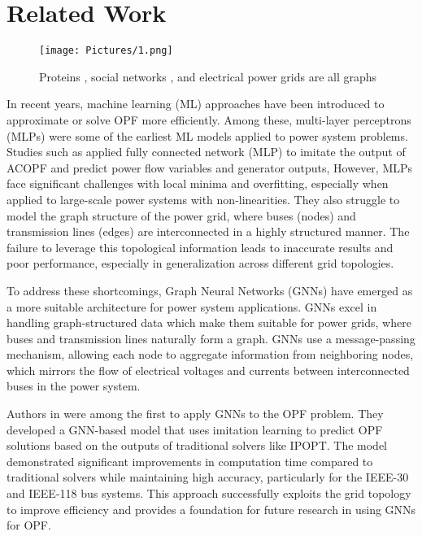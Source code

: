 \section{Related Work}
\label{gen_inst}

\begin{figure}[htbp]
  \centering
  \texttt{[image: Pictures/1.png]}
  \caption{Proteins \cite{vijayabaskar2011}, social networks \cite{ahmad2020}, and electrical power grids \cite{hosein2016} are all graphs}
  \label{fig:sample-figure}
\end{figure}

In recent years, machine learning (ML) approaches have been introduced to approximate or solve OPF more efficiently. Among these, multi-layer perceptrons (MLPs) were some of the earliest ML models applied to power system problems. Studies such as \cite{guha2019} applied fully connected network (MLP) to imitate the output of ACOPF and predict power flow variables and generator outputs, However, MLPs face significant challenges with local minima and overfitting, especially when applied to large-scale power systems with non-linearities. They also struggle to model the graph structure of the power grid, where buses (nodes) and transmission lines (edges) are interconnected in a highly structured manner. The failure to leverage this topological information leads to inaccurate results and poor performance, especially in generalization across different grid topologies.

To address these shortcomings, Graph Neural Networks (GNNs) have emerged as a more suitable architecture for power system applications. GNNs excel in handling graph-structured data which make them suitable for power grids, where buses and transmission lines naturally form a graph. GNNs use a message-passing mechanism, allowing each node to aggregate information from neighboring nodes, which mirrors the flow of electrical voltages and currents between interconnected buses in the power system.

Authors in \cite{chen2020} were among the first to apply GNNs to the OPF problem. They developed a GNN-based model that uses imitation learning to predict OPF solutions based on the outputs of traditional solvers like IPOPT. The model demonstrated significant improvements in computation time compared to traditional solvers while maintaining high accuracy, particularly for the IEEE-30 and IEEE-118 bus systems. This approach successfully exploits the grid topology to improve efficiency and provides a foundation for future research in using GNNs for OPF.

